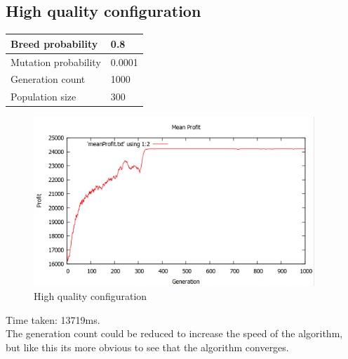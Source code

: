 \documentclass[fontsize=12pt,toc=bibliography, notitlepage]{scrreprt}
\begin{document}
\subsection{High quality configuration}
\label{subsec:good-config}

\begin{tabular}{ |l|l| }
	\hline
	Breed probability & 0.8 \\ \hline
	Mutation probability & 0.0001 \\ \hline
	Generation count & 1000 \\ \hline
	Population size & 300 \\ \hline
\end{tabular}
\begin{figure}[H]
	\centering
	\includegraphics[width=400px]{images/good-config.png}
	\caption{High quality configuration}
	\label{fig:good-config}
\end{figure}
Time taken: 13719ms.\\
The generation count could be reduced to increase the speed of the algorithm, but like this its more obvious to see that the algorithm converges.
\end{document}
